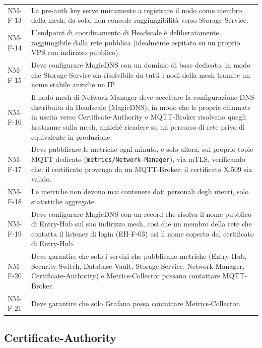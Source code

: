 \begin{longtable}{p{2.6cm} p{\dimexpr\linewidth-2.6cm-4\tabcolsep\relax}}
NM-F-13 & La pre-auth key serve unicamente a registrare il nodo come membro della mesh; da sola, non concede raggiungibilità verso Storage-Service. \\
NM-F-14 & L'endpoint di coordinamento di Headscale è deliberatamente raggiungibile dalla rete pubblica (idealmente ospitato su un proprio VPS con indirizzo pubblico). \\
NM-F-15 & Deve configurare MagicDNS con un dominio di base dedicato, in modo che Storage-Service sia risolvibile da tutti i nodi della mesh tramite un nome stabile anziché un IP. \\
NM-F-16 & Il nodo mesh di Network-Manager deve accettare la configurazione DNS distribuita da Headscale (MagicDNS), in modo che le proprie chiamate in uscita verso Certificate-Authority e MQTT-Broker risolvano quegli hostname sulla mesh, anziché ricadere su un percorso di rete privo di equivalente in produzione. \\
NM-F-17 & Deve pubblicare le metriche ogni minuto, e solo allora, sul proprio topic MQTT dedicato (\texttt{metrics/Network-Manager}), via mTLS, verificando che: il certificato provenga da un MQTT-Broker; il certificato X.509 sia valido. \\
NM-F-18 & Le metriche non devono mai contenere dati personali degli utenti, solo statistiche aggregate. \\
NM-F-19 & Deve configurare MagicDNS con un record che risolva il nome pubblico di Entry-Hub sul suo indirizzo mesh, così che un membro della rete che contatta il listener di login (EH-F-03) usi il nome coperto dal certificato di Entry-Hub. \\
NM-F-20 & Deve garantire che solo i servizi che pubblicano metriche (Entry-Hub, Security-Switch, Database-Vault, Storage-Service, Network-Manager, Certificate-Authority) e Metrics-Collector possano contattare MQTT-Broker. \\
NM-F-21 & Deve garantire che solo Grafana possa contattare Metrics-Collector. \\
\end{longtable}

\subsection{Certificate-Authority}

